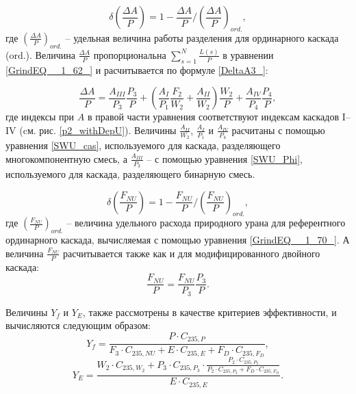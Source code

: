 \begin{equation} \label{DeltaA3} 
    \delta(\frac{\Delta A}{P})=1-\frac{\Delta A}{P}/(\frac{\Delta A}{P})_{ord.},
\end{equation}
где $(\frac{\Delta A}{P})_{ord.}$ -- удельная величина работы разделения для ординарного каскада (ord.). Величина $\frac{\Delta A}{P}$ пропорциональна $\sum _{s=1}^{N}\frac{L(s)}{P}$ в уравнении \ref{GrindEQ__1_62_} и расчитывается по формуле \ref{DeltaA3_}:

\begin{equation} \label{DeltaA3_} 
\frac{\Delta A}{P} = \frac{A_{III}}{P_3} \frac{P_3}{P}+(\frac{A_I}{P_1} \frac{F_2}{W_2}+\frac{A_{II}}{W_2}) \frac{W_2}{P} + \frac{A_{IV}}{P_4} \frac{P_4}{P},
\end{equation}
где индексы при $A$ в правой части уравнения соответствуют индексам каскадов I--IV (cм. рис. \ref{p2_withDepU}). Величины $\frac{A_{II}}{W_2}$, $\frac{A_I}{P_1}$ и $\frac{A_{IV}}{P_4}$ расчитаны с помощью уравнения \ref{SWU_cas}, используемого для каскада, разделяющего многокомпонентную смесь, а $\frac{A_{III}}{P_3}$ -- с помощью уравнения \ref{SWU_Phi}, используемого для каскада, разделяющего бинарную смесь.

\begin{equation} \label{DeltaFnu3} 
\delta(\frac{F_{NU}}{P})=1-\frac{F_{NU}}{P}/(\frac{F_{NU}}{P})_{ord.},
\end{equation} 
где $(\frac{F_{NU}}{P})_{ord.}$ -- величина удельного расхода природного урана для референтного ординарного каскада, вычисляемая с помощью уравнения \ref{GrindEQ__1_70_}. А величина $\frac{F_{NU}}{P}$ расчитывается также как и для модифицированного двойного каскада:
\begin{equation} \label{Delta_Fnu}
    \frac{F_{NU}}{P} = \frac{F_{NU}}{P_3} \frac{P_3}{P}.
\end{equation}

Величины $Y_f$ и $Y_{E}$, также рассмотрены в качестве критериев эффективности, и вычисляются следующим образом:
\begin{equation} \label{Rec3} 
    Y_{f} = \frac{P \cdot C_{235,P}}{F_3 \cdot C_{235,NU} + E \cdot C_{235,E} + F_D \cdot C_{235,F_D}},
\end{equation} 
\begin{equation} \label{RecR3} 
    Y_{E} = \frac{W_2\cdot C_{235,W_2} + P_3\cdot C_{235,P_3}\cdot \frac{P_2\cdot C_{235,P_2}}{P_2\cdot C_{235,P_2}+ F_D \cdot C_{235,F_D}}}{E \cdot C_{235,E}}   .     
\end{equation} 

